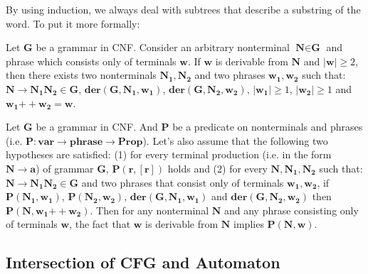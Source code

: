 By using induction, we always deal with subtrees that describe a substring of the word.
%
To put it more formally:
\begin{lemma} \label{lemma:chomskyind1}
Let $\textbf{G}$ be a grammar in CNF. Consider an arbitrary nonterminal $\textbf{N} \in \textbf{G}$ and phrase which consists only of terminals $\textbf{w}$.
If $\textbf{w}$ is derivable from $\boldsymbol{N}$ and $|\textbf{w}| \ge 2$, then there exists two nonterminals $\boldsymbol{N_1}, \boldsymbol{N_2}$ and two phrases $\boldsymbol{w_1, w_2}$ such that: $\boldsymbol{N \to N_1 N_2 \in G}$, $\boldsymbol{der(G, N_1, w_1)}$, $\boldsymbol{der(G, N_2, w_2)}$, $|\boldsymbol{w_1}| \ge 1$, $|\boldsymbol{w_2}| \ge 1$ and $\boldsymbol{w_1} \mathbin{++} \boldsymbol{w_2} = \textbf{w}$.
\end{lemma}

\begin{lemma}
	Let $\boldsymbol{G}$ be a grammar in CNF. And $\boldsymbol{P}$ be a predicate on nonterminals and phrases (i.e. $\textbf{P}: \textbf{var} \to \textbf{phrase} \to \textbf{Prop}$).
	Let's also assume that the following two hypotheses are satisfied:
	(1) for every terminal production (i.e. in the form $\boldsymbol{N} \to \boldsymbol{a}$) of grammar $\boldsymbol{G}$, $\boldsymbol{P}(\boldsymbol{r}, [\boldsymbol{r}])$ holds and (2) for every $\boldsymbol{N}, \boldsymbol{N_1}, \boldsymbol{N_2}$ such that: $\boldsymbol{N} \to \boldsymbol{N_1 N_2} \in \boldsymbol{G}$ and two phrases that consist only of terminals $\boldsymbol{w_1}, \boldsymbol{w_2}$, if $\boldsymbol{P}(\boldsymbol{N_1}, \boldsymbol{w_1})$, $\boldsymbol{P}(\boldsymbol{N_2}, \boldsymbol{w_2})$, $\boldsymbol{der}(\boldsymbol{G}, \boldsymbol{N_1}, \boldsymbol{w_1})$ and $\boldsymbol{der}(\boldsymbol{G}, \boldsymbol{N_2}, \boldsymbol{w_2})$ then $\boldsymbol{P}(\boldsymbol{N}, \boldsymbol{w_1} \mathbin{++} \boldsymbol{w_2})$.
	Then for any nonterminal $\boldsymbol{N}$ and any phrase consisting only of terminals $\boldsymbol{w}$, the fact that $\boldsymbol{w}$ is derivable from $\boldsymbol{N}$ implies $\boldsymbol{P}(\boldsymbol{N},\boldsymbol{w})$.
\end{lemma}

\subsection{Intersection of CFG and Automaton}

